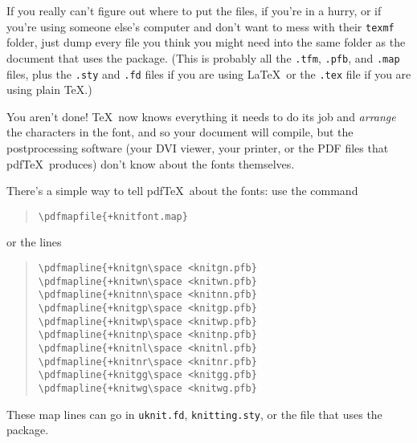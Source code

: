 \documentclass[draft]{amsart}
\begin{document}
If you really can't figure out where to put the files, if you're in a
hurry, or if you're using someone else's computer and don't want to mess
with their \texttt{texmf} folder, just dump every file you think you
might need into the same folder as the document that uses the package. (This is probably all the \texttt{.tfm}, \texttt{.pfb}, and \texttt{.map} files, plus the \texttt{.sty} and \texttt{.fd} files if you are using \LaTeX\ or the \texttt{.tex} file if you are using plain \TeX.)

You aren't done! \TeX\ now knows everything it needs to do its job and \emph{arrange} the characters in the font, and so your document will compile, but the postprocessing software (your DVI viewer, your printer, or the PDF files that pdf\/\TeX\ produces) don't know about the fonts themselves.

There's a simple way to tell pdf\/\TeX\ about the fonts: use the command
\begin{quote}\verb|\pdfmapfile{+knitfont.map}|\end{quote}
or the lines
\begin{quote}
\verb|\pdfmapline{+knitgn\space <knitgn.pfb}|\\
\verb|\pdfmapline{+knitwn\space <knitwn.pfb}|\\
\verb|\pdfmapline{+knitnn\space <knitnn.pfb}|\\
\verb|\pdfmapline{+knitgp\space <knitgp.pfb}|\\
\verb|\pdfmapline{+knitwp\space <knitwp.pfb}|\\
\verb|\pdfmapline{+knitnp\space <knitnp.pfb}|\\
\verb|\pdfmapline{+knitnl\space <knitnl.pfb}|\\
\verb|\pdfmapline{+knitnr\space <knitnr.pfb}|\\
\verb|\pdfmapline{+knitgg\space <knitgg.pfb}|\\
\verb|\pdfmapline{+knitwg\space <knitwg.pfb}|
\end{quote}
These map lines can go in \texttt{uknit.fd},
\texttt{knitting.sty}, or the file that uses the package.

\end{document}
